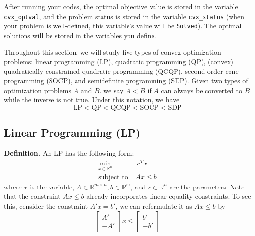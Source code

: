 \documentclass[
]{book}
\theoremstyle{definition}
\theoremstyle{definition}
\theoremstyle{definition}
\theoremstyle{definition}
\theoremstyle{remark}
\begin{document}
After running your codes, the optimal objective value is stored in the variable \texttt{cvx\_optval}, and the problem status is stored in the variable \texttt{cvx\_status} (when your problem is well-defined, this variable's value will be \texttt{Solved}). The optimal solutions will be stored in the variables you define.

Throughout this section, we will study five types of convex optimization problems: linear programming (LP), quadratic programming (QP), (convex) quadratically constrained quadratic programming (QCQP), second-order cone programming (SOCP), and semidefinite programming (SDP). Given two types of optimization problems \(A\) and \(B\), we say \(A < B\) if \(A\) can always be converted to \(B\) while the inverse is not true. Under this notation, we have
\begin{equation*}
   \text{LP} < \text{QP} < \text{QCQP} < \text{SOCP} < \text{SDP}
\end{equation*}

\hypertarget{linear-programming-lp}{%
\subsection{Linear Programming (LP)}\label{linear-programming-lp}}

\textbf{Definition.} An LP has the following form:
\begin{equation}
   \label{eq:app-lpdef}
   \begin{aligned}
      \min_{x \in \mathbb{R}^n} & \ c^T x \\
      \text{subject to } & A x \le b  
   \end{aligned}
\end{equation}
where \(x\) is the variable, \(A \in \mathbb{R}^{m\times n}, b \in \mathbb{R}^m\), and \(c \in \mathbb{R}^n\) are the parameters. Note that the constraint \(A x \le b\) already incorporates linear equality constraints. To see this, consider the constraint \(A' x = b'\), we can reformulate it as \(A x \le b\) by
\begin{equation*}
   \begin{bmatrix}
      A' \\ -A'
   \end{bmatrix} x \le \begin{bmatrix}
      b' \\ -b'
   \end{bmatrix}
\end{equation*}
\end{document}
